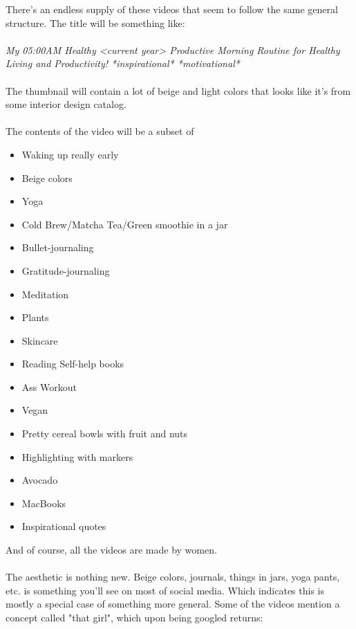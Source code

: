 There's an endless supply of these videos that seem to follow the same general structure. The title will be something like: \\
\\
\textit{My 05:00AM Healthy <current year> Productive Morning Routine for Healthy Living and Productivity! *inspirational* *motivational*} 
\\\\
The thumbnail will contain a lot of beige and light colors that looks like it's from some interior design catalog.
\\\\
The contents of the video will be a subset of

\begin{itemize}
    \item
        Waking up really early
    \item
        Beige colors
    \item
        Yoga
    \item
        Cold Brew/Matcha Tea/Green smoothie in a jar
    \item
        Bullet-journaling
    \item
        Gratitude-journaling
    \item
        Meditation
    \item
        Plants
    \item
        Skincare
    \item
        Reading Self-help books
    \item
        Ass Workout
    \item
        Vegan
    \item
        Pretty cereal bowls with fruit and nuts
    \item
        Highlighting with markers
    \item
        Avocado
    \item
        MacBooks
    \item
        Inspirational quotes
    
        
\end{itemize}

And of course, all the videos are made by women.
\\
\\
The aesthetic is nothing new. Beige colors, journals, things in jars, yoga pants, etc. is something you'll see on most of social media. Which indicates this is mostly a special case of something more general. Some of the videos mention a concept called "that girl", which upon being googled returns: 

